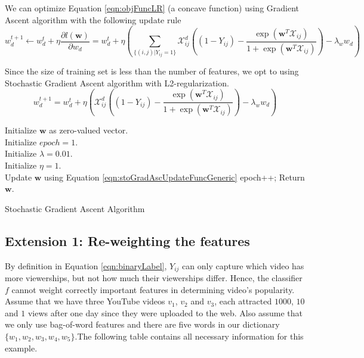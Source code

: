 	We can optimize Equation \ref{eqn:objFuncLR} (a concave function) using Gradient Ascent algorithm with the following update rule
		\begin{equation}
		w^{t+1}_d \leftarrow w^t_d + \eta \frac{\partial l(\textbf{w})}{\partial w_d} = w^t_d + \eta (\sum_{\{(i,j)|Y_{ij}=1\}} \mathcal{X}_{ij}^d ( (1 - Y_{ij}) - \frac{\exp(\textbf{w}^T\mathcal{X}_{ij})}{1 + \exp(\textbf{w}^T\mathcal{X}_{ij})})  - \lambda_w w_d)
		\end{equation}

	Since the size of training set is less than the number of features, we opt to using Stochastic Gradient Ascent algorithm with L2-regularization.
		\begin{equation}
		\label{eqn:stoGradAscUpdateFunc}
		w^{t+1}_d = w^t_d + \eta (\mathcal{X}_{ij}^d ( (1 - Y_{ij}) - \frac{\exp(\textbf{w}^T\mathcal{X}_{ij})}{1 + \exp(\textbf{w}^T\mathcal{X}_{ij})})  - \lambda_w w_d)
		\end{equation}

	\begin{algorithm}[h]\small
		Initialize $\textbf{w}$ as zero-valued vector.\\
		Initialize $epoch = 1$.\\
		Initialize $\lambda = 0.01$.\\
		Initialize $\eta = 1$.\\
		 {
			 {
				Update $\textbf{w}$ using Equation \ref{eqn:stoGradAscUpdateFuncGeneric}
			}    
			epoch++;
		}
		Return $\textbf{w}$.
		\caption{Stochastic Gradient Ascent Algorithm} \label{algo:stoGradAsc}
	\end{algorithm}

\subsection{Extension 1: Re-weighting the features}
\label{subsec:ext1}
	By definition in Equation \ref{eqn:binaryLabel}, $Y_{ij}$ can only capture which video has more viewerships, but not how much their viewerships differ. Hence, the classifier $f$ cannot weight correctly important features in determining video's popularity. Assume that we have three YouTube videos $v_1$, $v_2$ and $v_3$, each attracted $1000$, $10$ and $1$ views after one day since they were uploaded to the web. Also assume that we only use bag-of-word features and there are five words in our dictionary $\{w_1, w_2, w_3, w_4, w_5\}$.The following table contains all necessary information for this example.

